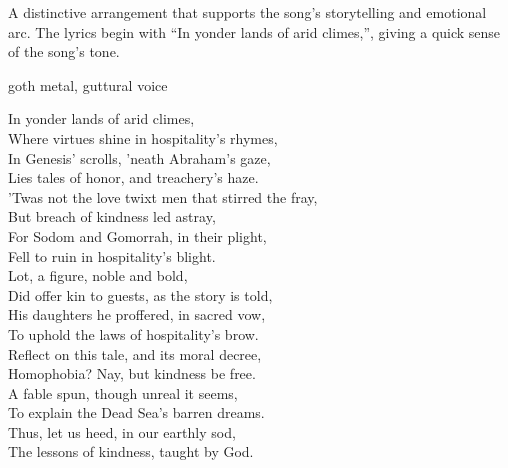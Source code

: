 

\begin{notes}
A distinctive arrangement that supports the song's storytelling and emotional arc. %
The lyrics begin with “In yonder lands of arid climes,”, giving a quick sense of the song’s tone.
\end{notes}

\begin{style}
goth metal, guttural voice
\end{style}

\begin{lyrics}
In yonder lands of arid climes,\\
Where virtues shine in hospitality's rhymes,\\
In Genesis' scrolls, 'neath Abraham's gaze,\\
Lies tales of honor, and treachery's haze.\\
'Twas not the love twixt men that stirred the fray,\\
But breach of kindness led astray,\\
For Sodom and Gomorrah, in their plight,\\
Fell to ruin in hospitality's blight.\\
Lot, a figure, noble and bold,\\
Did offer kin to guests, as the story is told,\\
His daughters he proffered, in sacred vow,\\
To uphold the laws of hospitality's brow.\\
Reflect on this tale, and its moral decree,\\
Homophobia? Nay, but kindness be free.\\
A fable spun, though unreal it seems,\\
To explain the Dead Sea's barren dreams.\\
Thus, let us heed, in our earthly sod,\\
The lessons of kindness, taught by God.

\end{lyrics}

